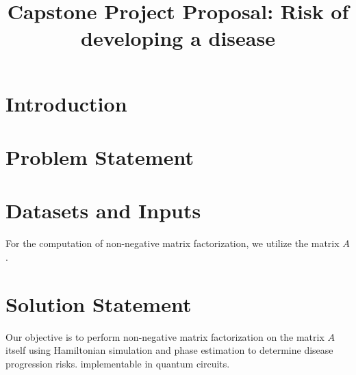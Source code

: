 \documentclass[12pt]{article}
\begin{document}
\title{Capstone Project Proposal: Risk of developing a disease}

\section{Introduction}

\section{Problem Statement}



\section{Datasets and Inputs}

For the computation of non-negative matrix factorization, we utilize the matrix $ A$.


\section{Solution Statement}

Our objective is to perform non-negative matrix factorization on the matrix $A$ itself using Hamiltonian simulation and phase estimation to determine disease progression risks. implementable in quantum circuits.

\end{document}
